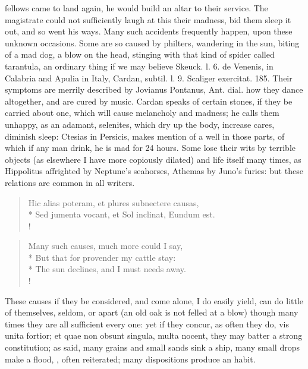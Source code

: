 {{fellows came to land again, he would build an altar to their
service. The magistrate could not sufficiently laugh at this their
madness, bid them sleep it out, and so went his ways. Many such
accidents frequently happen, upon these unknown occasions. Some are so
caused by philters, wandering in the sun, biting of a mad dog, a blow
on the head, stinging with that kind of spider called tarantula, an
ordinary thing if we may believe Skeuck. l. 6. de Venenis, in Calabria
and Apulia in Italy, Cardan, subtil. l. 9. Scaliger exercitat. 185.
Their symptoms are merrily described by Jovianus Pontanus, Ant. dial.
how they dance altogether, and are cured by music. Cardan speaks
of certain stones, if they be carried about one, which will cause
melancholy and madness; he calls them unhappy, as an adamant,
selenites, \etc{} which dry up the body, increase cares, diminish sleep:
Ctesias in Persicis, makes mention of a well in those parts, of which
if any man drink, he is mad for 24 hours. Some lose their wits by
terrible objects (as elsewhere I have more copiously dilated) and
life itself many times, as Hippolitus affrighted by Neptune's
seahorses, Athemas by Juno's furies: but these relations are common in
all writers.
%
\begin{latin}
\begin{verse}%
Hic alias poteram, et plures subnectere causas,\\*
Sed jumenta vocant, et Sol inclinat, Eundum est.\\!
\end{verse}%
\end{latin}
\translationrule%
\begin{verse}%
Many such causes, much more could I say,\\*
But that for provender my cattle stay:\\*
The sun declines, and I must needs away.\\!
\end{verse}%
%

These causes if they be considered, and come alone, I do easily yield,
can do little of themselves, seldom, or apart (an old oak is not felled
at a blow) though many times they are all sufficient every one: yet if
they concur, as often they do, vis unita fortior; et quae non obsunt
singula, multa nocent, they may batter a strong constitution; as
\Austin{} said, many grains and small sands sink a ship, many small
drops make a flood, \etc{}, often reiterated; many dispositions produce an
habit.

}}
